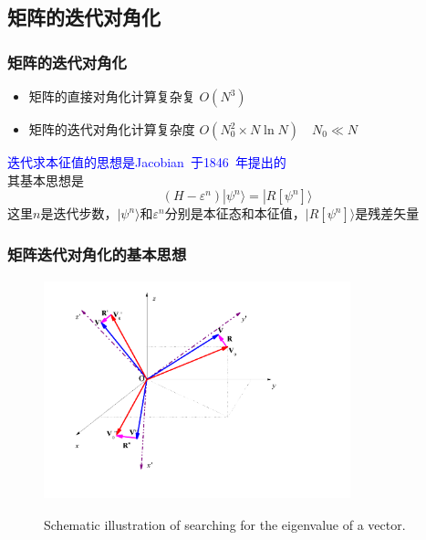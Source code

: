 \subsection{矩阵的迭代对角化}
\frame
{
	\frametitle{矩阵的迭代对角化}
	\begin{itemize}
		\item 矩阵的直接对角化计算复杂复 $O(N^3)$
		\item 矩阵的迭代对角化计算复杂度 $O(N_0^2\times N\ln N)\quad N_0\ll N$
	\end{itemize}
	\textcolor{blue}{迭代求本征值的思想是\textrm{Jacobian~}于\textrm{1846~}年提出的}\\
	其基本思想是
	\begin{displaymath}
		(H-\varepsilon^n)|\psi^n\rangle=|R[\psi^n]\rangle
	\end{displaymath}
	这里$n$是迭代步数，$|\psi^n\rangle$和$\varepsilon^n$分别是本征态和本征值，$|R[\psi^n]\rangle$是残差矢量
	\vskip 10pt
	{\fontsize{7.2pt}{1.2pt}}
}

\frame
{
	\frametitle{矩阵迭代对角化的基本思想}
\begin{figure}[h!]
\centering
\includegraphics[height=2.5in,width=3.5in,viewport=0 0 850 590,clip]{Figures/Coordinate_transformation.png}
\label{decent_CG}
\caption{\tiny \textrm{Schematic illustration of searching for the eigenvalue of a vector.}}%
\end{figure}
}

